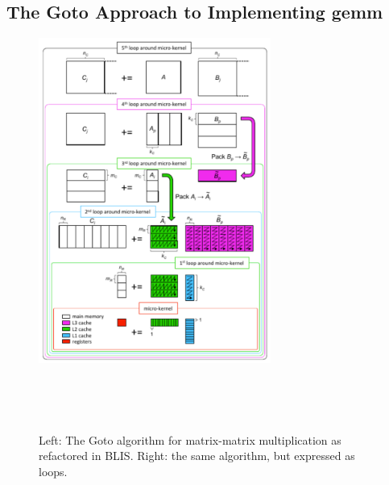 \subsection{The Goto Approach to Implementing {\sc gemm}}
\label{sec:BLIS}

\begin{figure}[tb!]
	\begin{center}
		\begin{minipage}{3in}
			\mbox{\includegraphics[width=3.0in]{mm_blis_color.pdf}}
		\end{minipage}
		~~~
		\begin{minipage}[t]{3in}
			\footnotesize  
			\mbox{  }
		\end{minipage}
	\end{center}
	\caption{Left: The Goto algorithm for matrix-matrix multiplication as  
		refactored in BLIS.  Right: the same algorithm, but expressed as  
		loops.}
	\label{fig:blis_gemm}
\end{figure}

